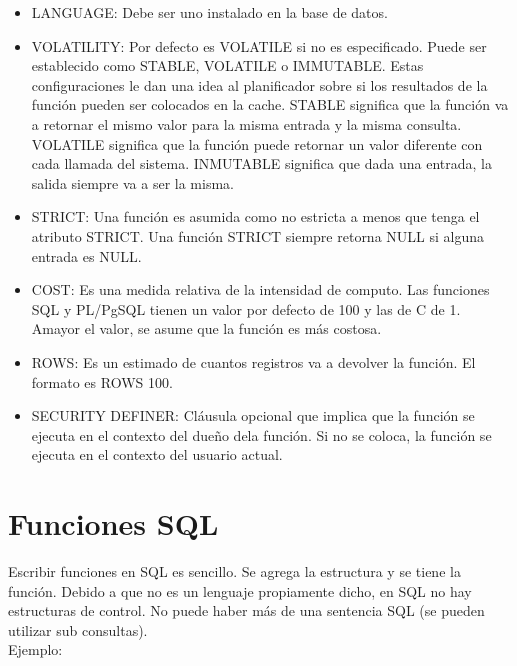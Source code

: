 \begin{itemize}
\item LANGUAGE: Debe ser uno instalado en la base de datos.
\item VOLATILITY: Por defecto es VOLATILE si no es especificado. Puede ser establecido como STABLE, VOLATILE o IMMUTABLE. Estas configuraciones le dan una idea al planificador sobre si los resultados de la función pueden ser colocados en la cache. STABLE significa que la función va a retornar el mismo valor para la misma entrada y la misma consulta. VOLATILE significa que la función puede retornar un valor diferente con cada llamada del sistema. INMUTABLE significa que dada una entrada, la salida siempre va a ser la misma.
\item STRICT: Una función es asumida como no estricta a menos que tenga el atributo STRICT. Una función STRICT siempre retorna NULL si alguna entrada es NULL. 
\item COST: Es una medida relativa de la intensidad de computo. Las funciones SQL y PL/PgSQL tienen un valor por defecto de 100 y las de C de 1. Amayor el valor, se asume que la función es más costosa.
\item ROWS: Es un estimado de cuantos registros va a devolver la función. El formato es ROWS 100.
\item SECURITY DEFINER: Cláusula opcional que implica que la función se ejecuta en el contexto del dueño dela función. Si no se coloca, la función se ejecuta en el contexto del usuario actual.
\end{itemize}

\section{Funciones SQL}

Escribir funciones en SQL es sencillo. Se agrega la estructura y se tiene la función. Debido a que no es un lenguaje propiamente dicho, en SQL no hay estructuras de control. No puede haber más de una sentencia SQL (se pueden utilizar sub consultas).\\

Ejemplo:\\


